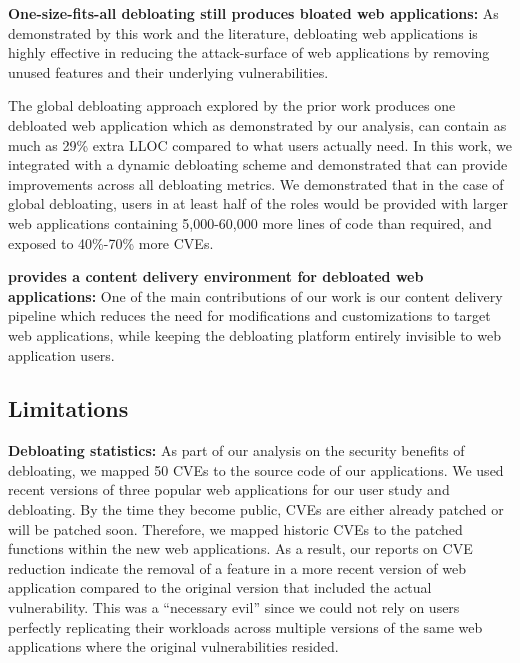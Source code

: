 \noindent\textbf{One-size-fits-all debloating still produces bloated web applications:} 
As demonstrated by this work and the literature, debloating web applications is highly effective in reducing the attack-surface of web applications by removing unused features and their underlying vulnerabilities. 

The global debloating approach explored by the prior work produces one debloated web application which as demonstrated by our analysis, can contain as much as 29\% extra LLOC compared to what users actually need. 
In this work, we integrated \dbltr{} with a dynamic debloating scheme and demonstrated that \dbltr{} can provide improvements across all debloating metrics. 
We demonstrated that in the case of global debloating, users in at least half of the roles would be provided with larger web applications containing 5,000-60,000 more lines of code than required, and exposed to 40\%-70\% more CVEs.


\noindent\textbf{\dbltr{} provides a content delivery environment for debloated web applications:} 
One of the main contributions of our work is our content delivery pipeline which reduces the need for modifications and customizations to target web applications, while keeping the debloating platform entirely invisible to web application users.

\subsection{Limitations} 


\noindent\textbf{Debloating statistics: }
As part of our analysis on the security benefits of debloating, we mapped 50 CVEs to the source code of our applications. 
We used recent versions of three popular web applications for our user study and debloating.
By the time they become public, CVEs are either already patched or will be patched soon. 
Therefore, we mapped historic CVEs to the patched functions within the new web applications. 
As a result, our reports on CVE reduction indicate the removal of a feature in a more recent version of web application compared to the original version that included the actual vulnerability. This was a ``necessary evil'' since we could not rely on users perfectly replicating their workloads across multiple versions of the same web applications where the original vulnerabilities resided.

